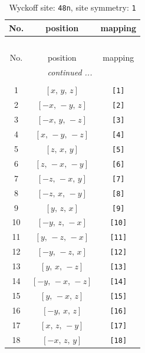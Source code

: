 \documentclass[fleqn,8pt]{jsarticle}
\begin{document}
\renewcommand{\arraystretch}{1.2}
\begin{longtable}{ccc}
\caption{Wyckoff site: {\tt 48n}, site symmetry: {\tt 1}}
 \\
 \hline \hline
No. & position & mapping \\ \hline \endfirsthead

\multicolumn{2}{l}{\tablename\ \thetable{}} \\
 \hline \hline
No. & position & mapping \\ \hline \endhead

 \hline \hline
\multicolumn{2}{r}{\footnotesize\it continued ...} \\ \endfoot

 \hline \hline
\multicolumn{2}{r}{} \\ \endlastfoot

1 & $\left[ x,\, y,\, z \right]$ & {\tt [1]} \\ \hline
2 & $\left[ - x,\, - y,\, z \right]$ & {\tt [2]} \\ \hline
3 & $\left[ - x,\, y,\, - z \right]$ & {\tt [3]} \\ \hline
4 & $\left[ x,\, - y,\, - z \right]$ & {\tt [4]} \\ \hline
5 & $\left[ z,\, x,\, y \right]$ & {\tt [5]} \\ \hline
6 & $\left[ z,\, - x,\, - y \right]$ & {\tt [6]} \\ \hline
7 & $\left[ - z,\, - x,\, y \right]$ & {\tt [7]} \\ \hline
8 & $\left[ - z,\, x,\, - y \right]$ & {\tt [8]} \\ \hline
9 & $\left[ y,\, z,\, x \right]$ & {\tt [9]} \\ \hline
10 & $\left[ - y,\, z,\, - x \right]$ & {\tt [10]} \\ \hline
11 & $\left[ y,\, - z,\, - x \right]$ & {\tt [11]} \\ \hline
12 & $\left[ - y,\, - z,\, x \right]$ & {\tt [12]} \\ \hline
13 & $\left[ y,\, x,\, - z \right]$ & {\tt [13]} \\ \hline
14 & $\left[ - y,\, - x,\, - z \right]$ & {\tt [14]} \\ \hline
15 & $\left[ y,\, - x,\, z \right]$ & {\tt [15]} \\ \hline
16 & $\left[ - y,\, x,\, z \right]$ & {\tt [16]} \\ \hline
17 & $\left[ x,\, z,\, - y \right]$ & {\tt [17]} \\ \hline
18 & $\left[ - x,\, z,\, y \right]$ & {\tt [18]} \\ \hline

\end{longtable}
\end{document}
